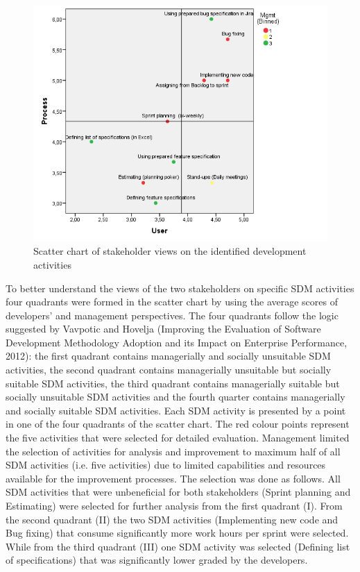 \begin{figure}
	\centering
	\includegraphics[width=\linewidth]{figures/survey-scatter-plot}
	\caption{Scatter chart of stakeholder views on the identified development activities}
	\label{fig:survey-scatter-plot}
\end{figure}


To better understand the views of the two stakeholders on specific SDM activities four quadrants were formed in the scatter chart by using the average scores of developers’ and management perspectives. The four quadrants follow the logic suggested by Vavpotic and Hovelja (Improving the Evaluation of Software Development Methodology Adoption and its Impact on Enterprise Performance, 2012): the first quadrant contains managerially and socially unsuitable SDM activities, the second quadrant contains managerially unsuitable but socially suitable SDM activities, the third quadrant contains managerially suitable but socially unsuitable SDM activities and the fourth quarter contains managerially and socially suitable SDM activities. Each SDM activity is presented by a point in one of the four quadrants of the scatter chart. The red colour points represent the five activities that were selected for detailed evaluation. Management limited the selection of activities for analysis and improvement to maximum half of all SDM activities (i.e. five activities) due to limited capabilities and resources available for the improvement processes. The selection was done as follows. All SDM activities that were unbeneficial for both stakeholders (Sprint planning and Estimating) were selected for further analysis from the first quadrant (I). From the second quadrant (II) the two SDM activities (Implementing new code and Bug fixing) that consume significantly more work hours per sprint were selected. While from the third quadrant (III) one SDM activity was selected (Defining list of specifications) that was significantly lower graded by the developers.

